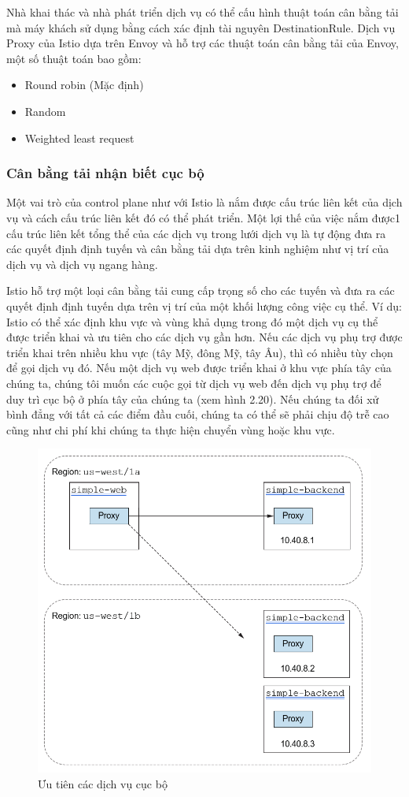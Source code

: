 \documentclass[12pt,a4paper]{report}
\begin{document}
Nhà khai thác và nhà phát triển dịch vụ có thể cấu hình thuật toán cân bằng tải mà máy khách sử dụng bằng cách xác định tài nguyên DestinationRule. Dịch vụ Proxy của Istio dựa trên Envoy và hỗ trợ các thuật toán cân bằng tải của Envoy, một số thuật toán bao gồm:
\begin{itemize}
	\item Round robin (Mặc định)
	\item Random
	\item Weighted least request
\end{itemize}
			\subsubsection{Cân bằng tải nhận biết cục bộ}
\hspace{0.6cm}Một vai trò của control plane như với Istio là nắm được cấu trúc liên kết của dịch vụ và cách cấu trúc liên kết đó có thể phát triển. Một lợi thế của việc nắm được1 cấu trúc liên kết tổng thể của các dịch vụ trong lưới dịch vụ là tự động đưa ra các quyết định định tuyến và cân bằng tải dựa trên kinh nghiệm như vị trí của dịch vụ và dịch vụ ngang hàng.

Istio hỗ trợ một loại cân bằng tải cung cấp trọng số cho các tuyến và đưa ra các quyết định định tuyến dựa trên vị trí của một khối lượng công việc cụ thể. Ví dụ: Istio có thể xác định khu vực và vùng khả dụng trong đó một dịch vụ cụ thể được triển khai và ưu tiên cho các dịch vụ gần hơn. Nếu các dịch vụ phụ trợ được triển khai trên nhiều khu vực (tây Mỹ, đông Mỹ, tây Âu), thì có nhiều tùy chọn để gọi dịch vụ đó. Nếu một dịch vụ web được triển khai ở khu vực phía tây của chúng ta, chúng tôi muốn các cuộc gọi từ dịch vụ web đến dịch vụ phụ trợ để duy trì cục bộ ở phía tây của chúng ta (xem hình 2.20). Nếu chúng ta đối xử bình đẳng với tất cả các điểm đầu cuối, chúng ta có thể sẽ phải chịu độ trễ cao cũng như chi phí khi chúng ta thực hiện chuyển vùng hoặc khu vực.
\begin{figure}[h]
	\centering
	\includegraphics[width=0.7\linewidth]{Pics/2.2.3-p3}
	\caption{Ưu tiên các dịch vụ cục bộ}
	\label{fig:2.2.3-3}
\end{figure}
\newpage
\end{document}
